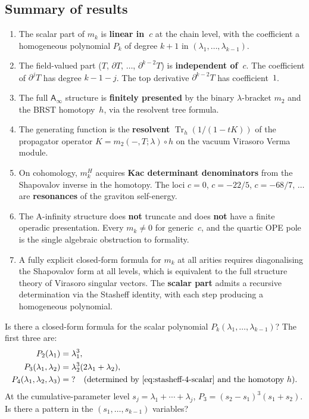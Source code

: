 \documentclass[11pt]{article}
\newcommand{\Ainf}{\mathsf{A}_{\infty}}
\newcommand{\Tr}{\operatorname{Tr}}
\begin{document}
\subsection*{Summary of results}

\begin{enumerate}
\item The scalar part of $m_k$ is \textbf{linear in~$c$}
  at the chain level, with the coefficient a homogeneous
  polynomial $P_k$ of degree $k+1$ in
  $(\lambda_1, \ldots, \lambda_{k-1})$.
\item The field-valued part ($T$, $\partial T$, $\ldots$,
  $\partial^{k-2}T$) is \textbf{independent of~$c$}.
  The coefficient of $\partial^j T$ has degree $k-1-j$.
  The top derivative $\partial^{k-2}T$ has coefficient~$1$.
\item The full $\Ainf$ structure is \textbf{finitely presented}
  by the binary $\lambda$-bracket $m_2$ and the BRST homotopy~$h$,
  via the resolvent tree formula.
\item The generating function is the \textbf{resolvent}
  $\Tr_h(1/(1-tK))$ of the propagator operator $K = m_2(-,T;\lambda) \circ h$
  on the vacuum Virasoro Verma module.
\item On cohomology, $m_k^H$ acquires \textbf{Kac determinant
  denominators} from the Shapovalov inverse in the homotopy.
  The loci $c = 0$, $c = -22/5$, $c = -68/7$, $\ldots$ are
  \textbf{resonances} of the graviton self-energy.
\item The A-infinity structure does \textbf{not} truncate and
  does \textbf{not} have a finite operadic presentation.
  Every $m_k \ne 0$ for generic~$c$, and the quartic
  OPE pole is the single algebraic obstruction to formality.
\item A fully explicit closed-form formula for $m_k$ at all
  arities requires diagonalising the Shapovalov form at all
  levels, which is equivalent to the full structure theory of
  Virasoro singular vectors.  The \textbf{scalar part} admits a
  recursive determination via the Stasheff identity, with each
  step producing a homogeneous polynomial.
\end{enumerate}

\begin{question}[Explicit $P_k$]\label{q:explicit-pk-wn}
Is there a closed-form formula for the scalar polynomial
$P_k(\lambda_1, \ldots, \lambda_{k-1})$?  The first three are:
\begin{align*}
P_2(\lambda_1) &= \lambda_1^3, \\
P_3(\lambda_1,\lambda_2) &= \lambda_2^3(2\lambda_1 + \lambda_2), \\
P_4(\lambda_1,\lambda_2,\lambda_3) &= \;?\quad
  \text{\textup{(}}
  \text{determined by~\eqref{eq:stasheff-4-scalar} and the homotopy~$h$}
  \text{\textup{)}}.
\end{align*}
At the cumulative-parameter level $s_j = \lambda_1 + \cdots + \lambda_j$,
$P_3 = (s_2 - s_1)^3(s_1 + s_2)$.  Is there a pattern in the
$(s_1, \ldots, s_{k-1})$ variables?
\end{question}
\end{document}
